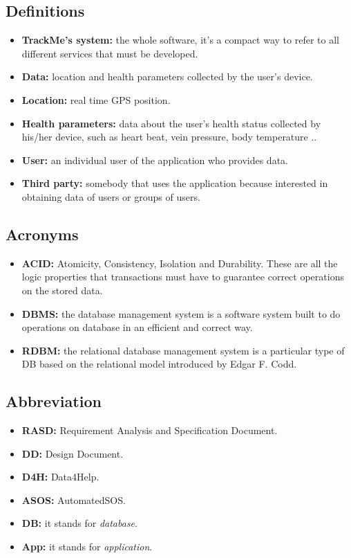 \subsection{Definitions}
\begin{itemize}
	\item{\textbf{TrackMe's system:} the whole software, it's a compact way to refer to all different services that must be developed.}
	
	\item {\textbf{Data:} location and health parameters collected by the user's device.}
	\item {\textbf{Location:} real time GPS position.}
	\item {\textbf{Health parameters:} data about the user's health status collected by his/her device, such as heart beat, 	vein pressure, body temperature ..}

	\item {\textbf{User:} an individual user of the application who provides data.}
	\item {\textbf{Third party:} somebody that uses the application because interested in obtaining data of users or groups of users.}
\end{itemize}

\subsection{Acronyms} 
\begin{itemize}
	\item \textbf{ACID:} Atomicity, Consistency, Isolation and Durability. These are all the logic properties that transactions must 	have to guarantee correct operations on the stored data.
	\item \textbf{DBMS:} the database management system is a software system built to do operations on database in an efficient and correct way.
	\item \textbf{RDBM:} the relational database management system is a particular type of DB based on the relational model introduced by Edgar F. Codd.
\end{itemize}

\subsection{Abbreviation}
\begin{itemize}
	\item {\textbf {RASD:} Requirement Analysis and Specification Document.}
	\item {\textbf {DD:} Design Document.}
	\item {\textbf {D4H:} Data4Help.} 
	\item {\textbf {ASOS:} AutomatedSOS.}
	\item \textbf{DB:} it stands for \textit{database}.
	\item \textbf{App:} it stands for \textit{application}.
\end{itemize}